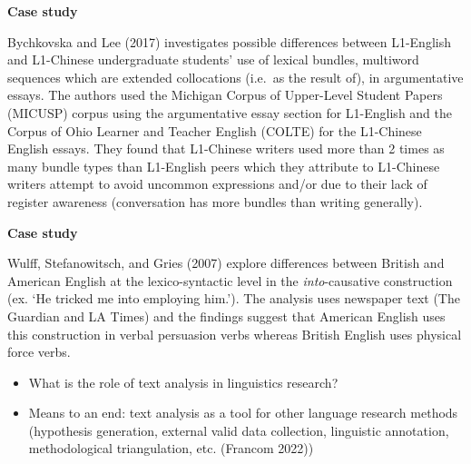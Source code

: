 \documentclass[
  letterpaper,
]{latex/krantz}
\begin{document}
\begin{tcolorbox}[enhanced jigsaw, arc=.35mm, leftrule=.75mm, rightrule=.15mm, opacityback=0, colback=white, breakable, bottomrule=.15mm, left=2mm, toprule=.15mm]

\textbf{ Case study}

Bychkovska and Lee (2017) investigates possible differences between
L1-English and L1-Chinese undergraduate students' use of lexical
bundles, multiword sequences which are extended collocations (i.e.~as
the result of), in argumentative essays. The authors used the Michigan
Corpus of Upper-Level Student Papers (MICUSP) corpus using the
argumentative essay section for L1-English and the Corpus of Ohio
Learner and Teacher English (COLTE) for the L1-Chinese English essays.
They found that L1-Chinese writers used more than 2 times as many bundle
types than L1-English peers which they attribute to L1-Chinese writers
attempt to avoid uncommon expressions and/or due to their lack of
register awareness (conversation has more bundles than writing
generally).

\end{tcolorbox}

\begin{tcolorbox}[enhanced jigsaw, arc=.35mm, leftrule=.75mm, rightrule=.15mm, opacityback=0, colback=white, breakable, bottomrule=.15mm, left=2mm, toprule=.15mm]

\textbf{ Case study}

Wulff, Stefanowitsch, and Gries (2007) explore differences between
British and American English at the lexico-syntactic level in the
\emph{into}-causative construction (ex. `He tricked me into employing
him.'). The analysis uses newspaper text (The Guardian and LA Times) and
the findings suggest that American English uses this construction in
verbal persuasion verbs whereas British English uses physical force
verbs.

\end{tcolorbox}

\begin{itemize}
\item
  What is the role of text analysis in linguistics research?
\item
  Means to an end: text analysis as a tool for other language research
  methods (hypothesis generation, external valid data collection,
  linguistic annotation, methodological triangulation, etc. (Francom
  2022))
\end{itemize}
\end{document}
